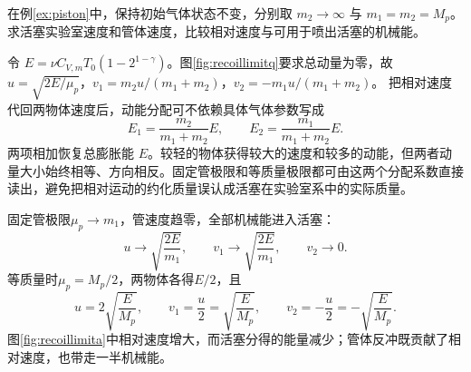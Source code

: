 \begin{exercise}[自由管模型的质量极限]
在例\ref{ex:piston}中，保持初始气体状态不变，分别取 $m_2\to\infty$ 与 $m_1=m_2=M_p$。求活塞实验室速度和管体速度，比较相对速度与可用于喷出活塞的机械能。
\end{exercise}
\begin{solution}
令 $E=\nu C_{V,m}T_0(1-2^{1-\gamma})$。图\ref{fig:recoillimitq}要求总动量为零，故 $u=\sqrt{2E/\mu_p}$，$v_1=m_2u/(m_1+m_2)$，$v_2=-m_1u/(m_1+m_2)$。
把相对速度代回两物体速度后，动能分配可不依赖具体气体参数写成
\[
 E_1=\frac{m_2}{m_1+m_2}E,\qquad
 E_2=\frac{m_1}{m_1+m_2}E.
\]
两项相加恢复总膨胀能 $E$。较轻的物体获得较大的速度和较多的动能，但两者动量大小始终相等、方向相反。固定管极限和等质量极限都可由这两个分配系数直接读出，避免把相对运动的约化质量误认成活塞在实验室系中的实际质量。

固定管极限$\mu_p\to m_1$，管速度趋零，全部机械能进入活塞：
\[u\longrightarrow\sqrt{\frac{2E}{m_1}},\qquad
v_1\longrightarrow\sqrt{\frac{2E}{m_1}},\qquad v_2\longrightarrow0.\]
等质量时$\mu_p=M_p/2$，两物体各得$E/2$，且
\[u=2\sqrt{\frac E{M_p}},\qquad
v_1=\frac u2=\sqrt{\frac E{M_p}},\qquad
v_2=-\frac u2=-\sqrt{\frac E{M_p}}.\]
图\ref{fig:recoillimita}中相对速度增大，而活塞分得的能量减少；管体反冲既贡献了相对速度，也带走一半机械能。
\end{solution}
